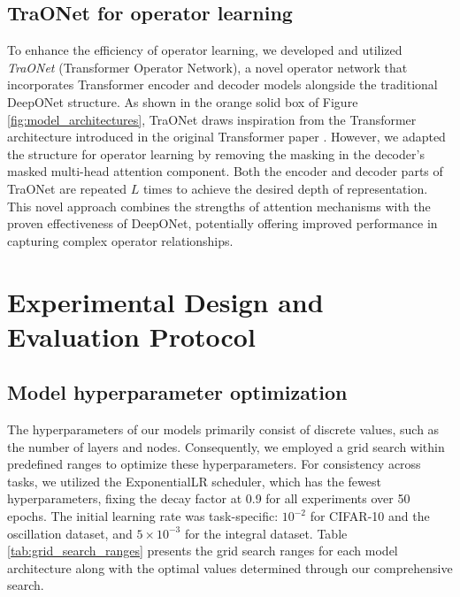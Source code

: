 \documentclass{article}
\theoremstyle{plain}
\theoremstyle{definition}
\theoremstyle{remark}
\begin{document}
\subsection{TraONet for operator learning}

To enhance the efficiency of operator learning, we developed and utilized \textit{TraONet} (Transformer Operator Network), a novel operator network that incorporates Transformer encoder and decoder models alongside the traditional DeepONet structure.
As shown in the orange solid box of Figure \ref{fig:model_architectures}, TraONet draws inspiration from the Transformer architecture introduced in the original Transformer paper \cite{vaswani2017attention}.
However, we adapted the structure for operator learning by removing the masking in the decoder's masked multi-head attention component.
Both the encoder and decoder parts of TraONet are repeated $L$ times to achieve the desired depth of representation.
This novel approach combines the strengths of attention mechanisms with the proven effectiveness of DeepONet, potentially offering improved performance in capturing complex operator relationships.

\section{Experimental Design and Evaluation Protocol}
\label{sec:experimental_design}

\subsection{Model hyperparameter optimization}

The hyperparameters of our models primarily consist of discrete values, such as the number of layers and nodes.
Consequently, we employed a grid search within predefined ranges to optimize these hyperparameters.
For consistency across tasks, we utilized the ExponentialLR scheduler, which has the fewest hyperparameters, fixing the decay factor at 0.9 for all experiments over 50 epochs.
The initial learning rate was task-specific: $10^{-2}$ for CIFAR-10 and the oscillation dataset, and $5 \times 10^{-3}$ for the integral dataset.
Table \ref{tab:grid_search_ranges} presents the grid search ranges for each model architecture along with the optimal values determined through our comprehensive search.
\end{document}
